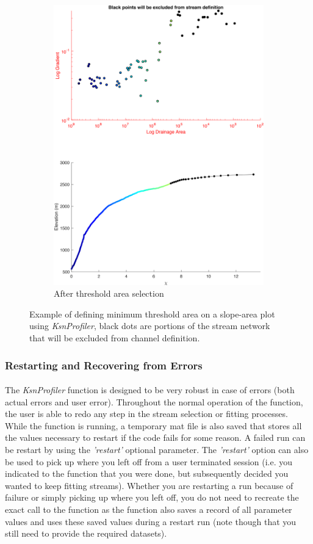 \begin{figure}[H]
\begin{subfigure}{.5\textwidth}
		\includegraphics[width=.8\linewidth]{PNGs/B92_StreamThresh_9_postPick.png}
		\caption{After threshold area selection}
		\label{fig:TSsub2}
	\end{subfigure}
	\caption{Example of defining minimum threshold area on a slope-area plot using \textit{KsnProfiler}, black dots are portions of the stream network that will be excluded from channel definition.}
	\label{fig:ThreshSelect}
\end{figure}

\subsubsection{Restarting and Recovering from Errors}
\paragraph{}The \textit{KsnProfiler} function is designed to be very robust in case of errors (both actual errors and user error). Throughout the normal operation of the function, the user is able to redo any step in the stream selection or fitting processes. While the function is running, a temporary mat file is also saved that stores all the values necessary to restart if the code fails for some reason. A failed run can be restart by using the \textit{'restart'} optional parameter. The \textit{'restart'} option can also be used to pick up where you left off from a user terminated session (i.e. you indicated to the function that you were done, but subsequently decided you wanted to keep fitting streams). Whether you are restarting a run because of failure or simply picking up where you left off, you do not need to recreate the exact call to the function as the function also saves a record of all parameter values and uses these saved values during a restart run (note though that you still need to provide the required datasets).

